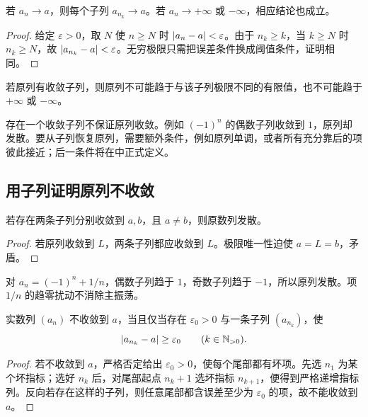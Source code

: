 \begin{theorem}
若 \(a_n\to a\)，则每个子列 \(a_{n_k}\to a\)。若 \(a_n\to+\infty\) 或 \(-\infty\)，相应结论也成立。
\end{theorem}

\begin{proof}
给定 \(\varepsilon>0\)，取 \(N\) 使 \(n\ge N\) 时
\(\left|a_n-a\right|<\varepsilon\)。由于 \(n_k\ge k\)，当 \(k\ge N\) 时 \(n_k\ge N\)，故
\(\left|a_{n_k}-a\right|<\varepsilon\)。无穷极限只需把误差条件换成阈值条件，证明相同。
\end{proof}

\begin{corollary}
若原列有收敛子列，则原列不可能趋于与该子列极限不同的有限值，也不可能趋于 \(+\infty\) 或 \(-\infty\)。
\end{corollary}

\begin{insightbox}[一个收敛子列说明不了整列]
存在一个收敛子列不保证原列收敛。例如 \((-1)^n\) 的偶数子列收敛到 \(1\)，原列却发散。要从子列恢复原列，需要额外条件，例如原列单调，或者所有充分靠后的项彼此接近；后一条件将在中正式定义。
\end{insightbox}

\subsection{用子列证明原列不收敛}


\begin{theorem}[子列判别的反面]
若存在两条子列分别收敛到 \(a,b\)，且 \(a\ne b\)，则原数列发散。
\end{theorem}

\begin{proof}
若原列收敛到 \(L\)，两条子列都应收敛到 \(L\)。极限唯一性迫使 \(a=L=b\)，矛盾。
\end{proof}

\begin{example}
对 \(a_n=(-1)^n+1/n\)，偶数子列趋于 \(1\)，奇数子列趋于 \(-1\)，所以原列发散。项 \(1/n\) 的趋零扰动不消除主振荡。
\end{example}

\begin{proposition}
实数列 \((a_n)\) 不收敛到 \(a\)，当且仅当存在 \(\varepsilon_0>0\) 与一条子列 \((a_{n_k})\)，使
\[
 \left|a_{n_k}-a\right|\ge\varepsilon_0\qquad(k\in\mathbb{N}_{>0}).
\]
\end{proposition}

\begin{proof}
若不收敛到 \(a\)，严格否定给出 \(\varepsilon_0>0\)，使每个尾部都有坏项。先选 \(n_1\) 为某个坏指标；选好 \(n_k\) 后，对尾部起点 \(n_k+1\) 选坏指标 \(n_{k+1}\)，便得到严格递增指标列。反向若存在这样的子列，则任意尾部都含误差至少为 \(\varepsilon_0\) 的项，故不能收敛到 \(a\)。
\end{proof}

